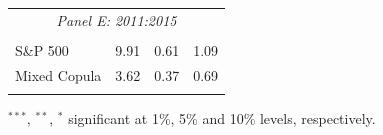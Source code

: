 \documentclass[pdf,9pt,xcolor=dvipsnames,hide notes]{beamer}
\begin{document}
\begin{frame}
\begin{threeparttable}[H]
\begin{tabularx}{\textwidth}{@{\extracolsep{\fill}}llll@{}}
		\multicolumn{4}{c}{\textit{Panel E: 2011:2015}} \\
		&       &       &       \\
		S\&P 500 & 9.91  & 0.61  & 1.09 \\
		Mixed Copula & 3.62  & 0.37  & 0.69 \\
		\multicolumn{1}{r}{} & \multicolumn{1}{r}{} & \multicolumn{1}{r}{} & \multicolumn{1}{r}{} \\
		\bottomrule
	\end{tabularx}%
	\begin{tablenotes}
		\item \scriptsize $^{\ast\ast\ast}$, $^{\ast\ast}$, $^{\ast}$  significant at 1\%, 5\% and 10\% levels, respectively.
	\end{tablenotes}
	\label{tab:table107}%
\end{threeparttable}%

\end{frame}
\end{document}
